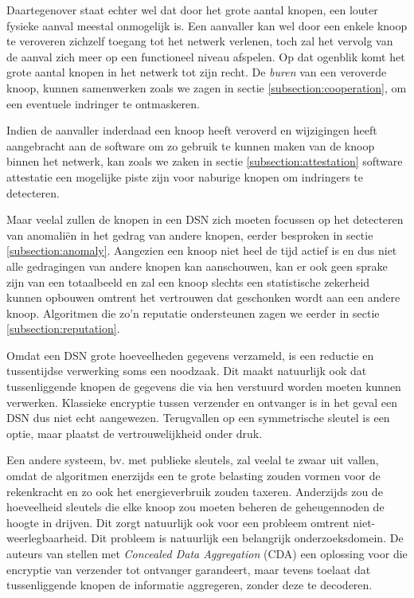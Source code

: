 Daartegenover staat echter wel dat door het grote aantal knopen, een louter
fysieke aanval meestal onmogelijk is. Een aanvaller kan wel door een enkele
knoop te veroveren zichzelf toegang tot het netwerk verlenen, toch zal het
vervolg van de aanval zich meer op een functioneel niveau afspelen. Op dat
ogenblik komt het grote aantal knopen in het netwerk tot zijn recht. De
\emph{buren} van een veroverde knoop, kunnen samenwerken zoals we zagen in
sectie \ref{subsection:cooperation}, om een eventuele indringer te ontmaskeren.

Indien de aanvaller inderdaad een knoop heeft veroverd en wijzigingen heeft
aangebracht aan de software om zo gebruik te kunnen maken van de knoop binnen
het netwerk, kan zoals we zaken in sectie \ref{subsection:attestation} software
attestatie een mogelijke piste zijn voor naburige knopen om indringers te
detecteren.

Maar veelal zullen de knopen in een DSN zich moeten focussen op het detecteren
van anomali\"en in het gedrag van andere knopen, eerder besproken in sectie
\ref{subsection:anomaly}. Aangezien een knoop niet heel de tijd actief is en
dus niet alle gedragingen van andere knopen kan aanschouwen, kan er ook geen
sprake zijn van een totaalbeeld en zal een knoop slechts een statistische
zekerheid kunnen opbouwen omtrent het vertrouwen dat geschonken wordt aan een
andere knoop. Algoritmen die zo'n reputatie ondersteunen zagen we eerder in
sectie \ref{subsection:reputation}.

Omdat een DSN grote hoeveelheden gegevens verzameld, is een reductie en
tussentijdse verwerking soms een noodzaak. Dit maakt natuurlijk ook dat
tussenliggende knopen de gegevens die via hen verstuurd worden moeten kunnen
verwerken. Klassieke encryptie tussen verzender en ontvanger is in het geval
een DSN dus niet echt aangewezen. Terugvallen op een symmetrische sleutel is
een optie, maar plaatst de vertrouwelijkheid onder druk.

Een andere systeem, bv. met publieke sleutels, zal veelal te zwaar uit vallen,
omdat de algoritmen enerzijds een te grote belasting zouden vormen voor de
rekenkracht en zo ook het energieverbruik zouden taxeren. Anderzijds zou de
hoeveelheid sleutels die elke knoop zou moeten beheren de geheugennoden de
hoogte in drijven. Dit zorgt natuurlijk ook voor een probleem omtrent
niet-weerlegbaarheid. Dit probleem is natuurlijk een belangrijk
onderzoeksdomein. De auteurs van \citep{girao2005cda} stellen met
\emph{Concealed Data Aggregation} (CDA) een oplossing voor die encryptie van
verzender tot ontvanger garandeert, maar tevens toelaat dat tussenliggende
knopen de informatie aggregeren, zonder deze te decoderen.

